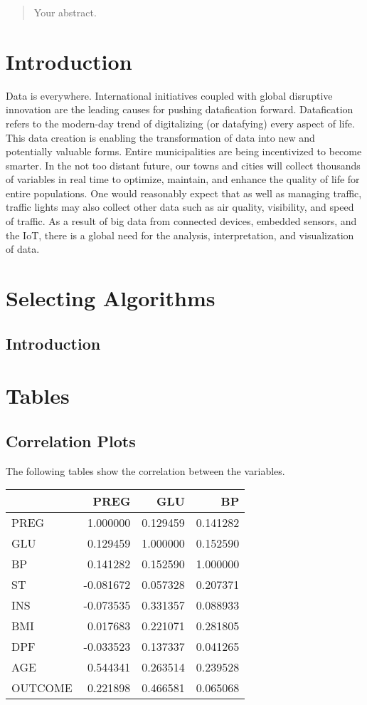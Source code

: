\documentclass[12pt]{article}
\begin{document}
\newpage
\begin{abstract}
Your abstract.
\end{abstract}

\section{Introduction}
Data is everywhere. International initiatives coupled with global disruptive innovation are the leading causes for pushing datafication forward. Datafication refers to the modern-day trend of digitalizing (or datafying) every aspect of life. This data creation is enabling the transformation of data into new and potentially valuable forms. Entire municipalities are being incentivized to become smarter. In the not too distant future, our towns and cities will collect thousands of variables in real time to optimize, maintain, and enhance the quality of life for entire populations. One would reasonably expect that as well as managing traffic, traffic lights may also collect other data such as air quality, visibility, and speed of traffic. As a result of big data from connected devices, embedded sensors, and the IoT, there is a global need for the analysis, interpretation, and visualization of data.

\section{Selecting Algorithms}
\subsection{Introduction}


\newpage

\section{Tables}
\subsection{Correlation Plots}
The following tables show the correlation between the variables.
\begin{tabular}{lrrr}
\toprule
{} &      PREG &       GLU &        BP \\
\midrule
PREG    &  1.000000 &  0.129459 &  0.141282 \\
GLU     &  0.129459 &  1.000000 &  0.152590 \\
BP      &  0.141282 &  0.152590 &  1.000000 \\
ST      & -0.081672 &  0.057328 &  0.207371 \\
INS     & -0.073535 &  0.331357 &  0.088933 \\
BMI     &  0.017683 &  0.221071 &  0.281805 \\
DPF     & -0.033523 &  0.137337 &  0.041265 \\
AGE     &  0.544341 &  0.263514 &  0.239528 \\
OUTCOME &  0.221898 &  0.466581 &  0.065068 \\
\bottomrule
\end{tabular}
\end{document}
